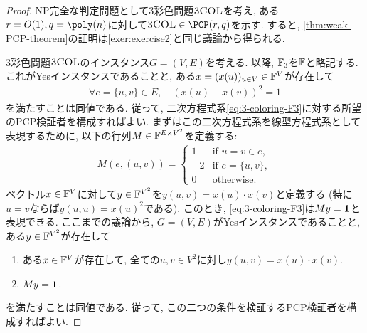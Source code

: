 \begin{proof}
  NP完全な判定問題として3彩色問題$\textsc{3COL}$を考え, ある$r=O(1),q=\poly(n)$に対して$\ThreeCOL\in\PCP(r,q)$を示す.
  すると, \cref{thm:weak-PCP-theorem}の証明は\cref{exer:exercise2}と同じ議論から得られる.

  3彩色問題$\textsc{3COL}$のインスタンス$G=(V,E)$を考える.
  以降, $\mathbb{F}_3$を$\mathbb{F}$と略記する.
  これがYesインスタンスであることと, ある$x=(x(u))_{u\in V}\in\mathbb{F}^V$が存在して
  \begin{align}
    \forall e=\{u,v\}\in E, \quad (x(u) - x(v))^2 = 1 \label{eq:3-coloring-F3}
  \end{align}
  を満たすことは同値である. 従って, 二次方程式系\cref{eq:3-coloring-F3}に対する所望のPCP検証者を構成すればよい.
  まずはこの二次方程式系を線型方程式系として表現するために, 以下の行列$M \in \mathbb{F}^{E \times V^2}$を定義する:
  \begin{align*}
    M(e, (u,v)) = \begin{cases}
      1 & \text{if } u=v\in e,\\
      -2 & \text{if } e=\{u,v\},\\
      0 & \text{otherwise}.
    \end{cases}
  \end{align*}
  ベクトル$x\in\mathbb{F}^V$に対して$y\in\mathbb{F}^{V^2}$を$y(u,v)=x(u)\cdot x(v)$と定義する (特に$u=v$ならば$y(u,u)=x(u)^2$である).
  このとき, \cref{eq:3-coloring-F3}は$My=\mathbf{1}$と表現できる.
  ここまでの議論から, $G=(V,E)$がYesインスタンスであることと, ある$y\in \mathbb{F}^{V^2}$が存在して
  \begin{enumerate}
    \item ある$x\in\mathbb{F}^V$が存在して, 全ての$u,v\in V^2$に対し$y(u,v)=x(u)\cdot x(v)$.
    \item $My=\mathbf{1}$.
  \end{enumerate}
  を満たすことは同値である.
  従って, この二つの条件を検証するPCP検証者を構成すればよい.
  
  

\end{proof}

